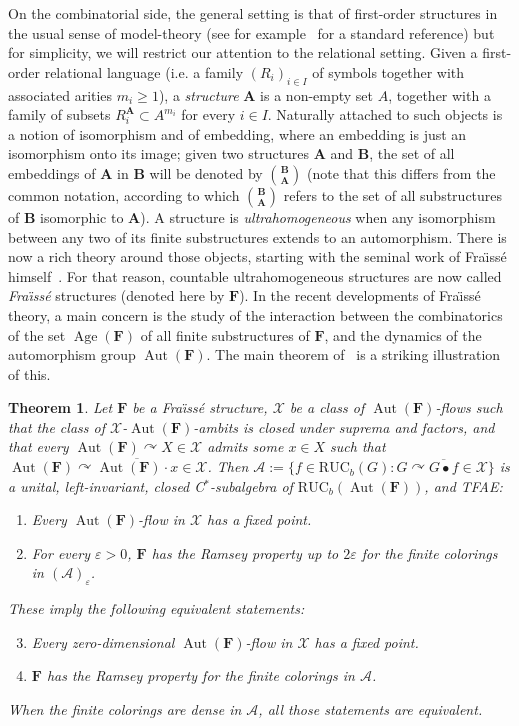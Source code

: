 \documentclass[11pt]{article}
\newtheorem{theo}{Theorem}[section]
\theoremstyle{definition}
\numberwithin{equation}{section}
\numberwithin{figure}{section}
\numberwithin{table}{section}
\newcommand{\A}{\mathcal A}
\newcommand*{\mA}{\mathbf{A}}
\newcommand*{\mB}{\mathbf{B}}
\newcommand*{\mF}{\mathbf{F}}
\newcommand{\e}{\varepsilon}
\DeclareMathOperator{\Aut}{Aut}
\DeclareMathOperator{\Age}{Age}
\newcommand{\actson}{\curvearrowright}
\newcommand{\RUCB}{\mathrm{RUC}_{b}}
\begin{document}
On the combinatorial side, the general setting is that of first-order structures in the usual sense of model-theory (see for example~\cite{H} for a standard reference) but for simplicity, we will restrict our attention to the relational setting. Given a first-order relational language (i.e. a family $(R_{i})_{i\in I}$ of symbols together with associated arities $m_{i}\geq 1$), a \emph{structure} $\mA$ is a non-empty set $A$, together with a family of subsets $R^{\mA}_{i}\subset A^{m_{i}}$ for every $i\in I$. Naturally attached to such objects is a notion of isomorphism and of embedding, where an embedding is just an isomorphism onto its image; given two structures $\mA$ and $\mB$, the set of all embeddings of $\mA$ in $\mB$ will be denoted by $\binom{\mB}{\mA}$ (note that this differs from the common notation, according to which $\binom{\mB}{\mA}$ refers to the set of all substructures of $\mB$ isomorphic to $\mA$). A structure is \emph{ultrahomogeneous} when any isomorphism between any two of its finite substructures extends to an automorphism. There is now a rich theory around those objects, starting with the seminal work of Fra\"{\i}ss\'e himself~\cite{Fr0}. For that reason, countable ultrahomogeneous structures are now called \emph{Fra\"{\i}ss\'e} structures (denoted here by $\mF$). In the recent developments of Fra\"{\i}ss\'e theory, a main concern is the study of the interaction between the combinatorics of the set $\Age(\mF)$ of all finite substructures of $\mF$, and the dynamics of the automorphism group $\Aut(\mF)$. The main theorem of~\cite{KPT} is a striking illustration of this.

\begin{theo}\label{thm:fpRP}
Let $\mF$ be a Fra\"{\i}ss\'e structure, $\mathcal X$ be a class of $\Aut(\mF)$-flows such that the class of $\mathcal X$-$\Aut(\mF)$-ambits is closed under suprema and factors, and that every $\Aut(\mF)\actson X\in \mathcal X$ admits some $x\in X$ such that $\Aut(\mF)\actson \overline{\Aut(\mF)\cdot x}\in \mathcal X$. Then $\A:=\{ f\in \RUCB(G) : G\actson \overline{G\bullet f} \in \mathcal X\}$ is a unital, left-invariant, closed C$^{*}$-subalgebra of $\RUCB(\Aut(\mF))$, and TFAE:
\begin{enumerate}
\item Every $\Aut(\mF)$-flow in $\mathcal X$ has a fixed point.
\item For every $\e>0$, $\mF$ has the Ramsey property up to $2\e$ for the finite colorings in $(\A)_{\e}$.
\end{enumerate}

These imply the following equivalent statements:
\begin{enumerate}
\setcounter{enumi}{2}
\item Every zero-dimensional $\Aut(\mF)$-flow in $\mathcal X$ has a fixed point.
\item $\mF$ has the Ramsey property for the finite colorings in $\A$.
\end{enumerate}

When the finite colorings are dense in $\A$, all those statements are equivalent.
\end{theo}
\end{document}
